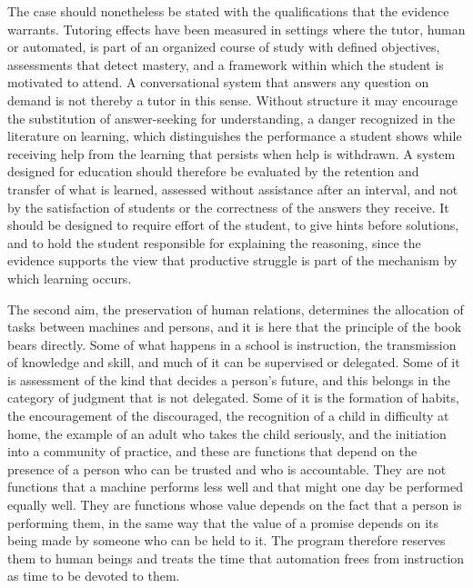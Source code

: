 The case should nonetheless be stated with the qualifications that the evidence warrants. Tutoring effects have been measured in settings where the tutor, human or automated, is part of an organized course of study with defined objectives, assessments that detect mastery, and a framework within which the student is motivated to attend. A conversational system that answers any question on demand is not thereby a tutor in this sense. Without structure it may encourage the substitution of answer-seeking for understanding, a danger recognized in the literature on learning, which distinguishes the performance a student shows while receiving help from the learning that persists when help is withdrawn. A system designed for education should therefore be evaluated by the retention and transfer of what is learned, assessed without assistance after an interval, and not by the satisfaction of students or the correctness of the answers they receive. It should be designed to require effort of the student, to give hints before solutions, and to hold the student responsible for explaining the reasoning, since the evidence supports the view that productive struggle is part of the mechanism by which learning occurs.

The second aim, the preservation of human relations, determines the allocation of tasks between machines and persons, and it is here that the principle of the book bears directly. Some of what happens in a school is instruction, the transmission of knowledge and skill, and much of it can be supervised or delegated. Some of it is assessment of the kind that decides a person's future, and this belongs in the category of judgment that is not delegated. Some of it is the formation of habits, the encouragement of the discouraged, the recognition of a child in difficulty at home, the example of an adult who takes the child seriously, and the initiation into a community of practice, and these are functions that depend on the presence of a person who can be trusted and who is accountable. They are not functions that a machine performs less well and that might one day be performed equally well. They are functions whose value depends on the fact that a person is performing them, in the same way that the value of a promise depends on its being made by someone who can be held to it. The program therefore reserves them to human beings and treats the time that automation frees from instruction as time to be devoted to them.

